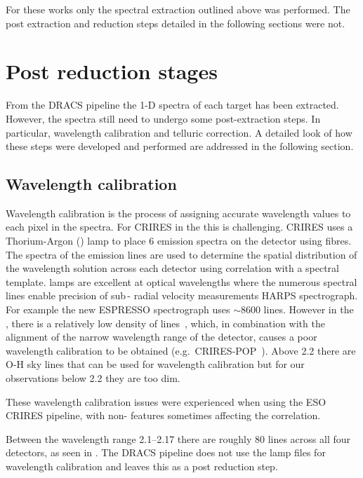 For these works only the spectral extraction outlined above was performed.
The post extraction and reduction steps detailed in the following sections were not.


\section{Post reduction stages}
\label{sec:posreduction}
From the {DRACS} pipeline the 1-D spectra of each target has been extracted.
However, the spectra still need to undergo some post-extraction steps.
In particular, wavelength calibration and telluric correction.
A detailed look of how these steps were developed and performed are addressed in the following section.

\subsection{Wavelength calibration}
\label{subsec:wavecalib}

Wavelength calibration is the process of assigning accurate wavelength values to each pixel in the spectra.
For {CRIRES} in the \nir{} this is challenging.
{CRIRES} uses a Thorium-Argon (\thar) lamp to place 6 emission spectra on the detector using fibres.
The spectra of the \thar{} emission lines are used to determine the spatial distribution of the wavelength solution across each detector using correlation with a spectral template.
\thar{} lamps are excellent at optical wavelengths where the numerous spectral lines enable precision of sub\,-\mps{} radial velocity measurements HARPS spectrograph.
For example the new ESPRESSO spectrograph uses \(\sim8600\) \thar{} lines.
However in the \nir{}, there is a relatively low density of \thar{} lines~\citep{kerber_laboratory_2009}, which, in combination with the alignment of the narrow wavelength range of the detector, causes a poor wavelength calibration to be obtained (e.g.\ {CRIRES}-POP~\citep{nicholls_crirespop_2017}).
Above 2.2\um{} there are {O-H} sky lines that can be used for wavelength calibration but for our observations below 2.2\um{} they are too dim.

These wavelength calibration issues were experienced when using the {ESO} {CRIRES} pipeline, with non-\thar{} features sometimes affecting the correlation.

Between the wavelength range 2.1--2.17\um{} there are roughly 80 \thar{} lines across all four detectors, as seen in .
The {DRACS} pipeline does not use the \thar{} lamp files for wavelength calibration and leaves this as a post reduction step.

